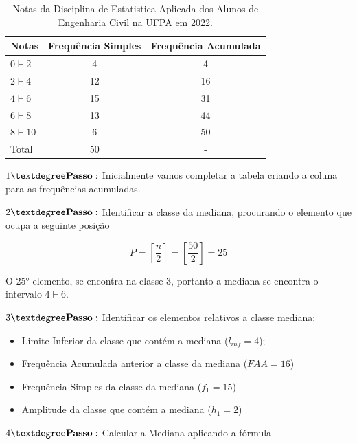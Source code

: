   \begin{table}[!htb]
    \centering
    {
    \caption{Notas da Disciplina de Estatistica Aplicada dos Alunos de Engenharia Civil na UFPA em 2022.}
    \label{exemplomediana}
    \vspace{0.1cm}
\begin{tabular}{l|c|c}
  \hline\hline
  Notas          & Frequência Simples & Frequência Acumulada \\
  \hline\hline
  $0 \vdash 2  $ & 4          & 4                    \\
  $2 \vdash 4  $ & 12         & 16                   \\
  $4 \vdash 6  $ & 15         & 31                   \\
  $6 \vdash 8  $ & 13         & 44                   \\
  $8 \vdash 10 $ & 6          & 50                   \\
  \hline\hline
  Total & 50                  &  - \\
    \hline\hline
\end{tabular}}
\end{table}

$1° \mbox{\textbf{Passo}}:$ Inicialmente vamos completar a tabela criando a coluna para as frequências acumuladas.\vskip0.3cm

$2° \mbox{\textbf{Passo}}:$ Identificar a classe da mediana, procurando o elemento que ocupa a seguinte posição

$$ P= \left[ \frac{n}{2} \right] = \left[ \frac{50}{2} \right] = 25 $$

O 25° elemento, se encontra na classe 3, portanto a mediana se encontra o intervalo $ 4 \vdash 6$.

\vskip0.3cm

$3° \mbox{\textbf{Passo}}:$ Identificar os elementos relativos a classe mediana:

\begin{itemize}
  \item Limite Inferior da classe que contém a mediana ($l_{inf}=4$);
  \item Frequência Acumulada anterior a classe da mediana ($FAA=16$)
  \item Frequência Simples da classe da mediana ($f_{1}=15$)
  \item Amplitude da classe que contém a mediana ($h_{1}=2$)
\end{itemize}

$4° \mbox{\textbf{Passo}}:$ Calcular a Mediana aplicando a fórmula


